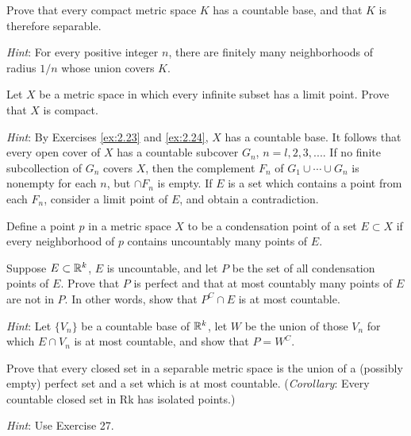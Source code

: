 \begin{myExercise}
    \label{ex:2.25}
    Prove that every compact metric space $K$ has a countable base, 
    and that $K$ is therefore separable. 
    
    \emph{Hint}: For every positive integer $n$, 
    there are finitely many neighborhoods of radius $1/n$ whose union covers $K$.
\end{myExercise}


\begin{myExercise}
    \label{ex:2.26}
    Let $X$ be a metric space in which every infinite subset has a limit point. 
    Prove that $X$ is compact. 
    
    \emph{Hint}: By Exercises \ref{ex:2.23} and \ref{ex:2.24}, 
    $X$ has a countable base. 
    It follows that every open cover of $X$ has a countable subcover ${G_n}$, $n = l, 2, 3, ...$.
    If no finite subcollection of ${G_n}$ covers $X$, 
    then the complement $F_n$ of $G_1 \cup \cdots \cup G_n$
    is nonempty for each $n$, but $\cap F_n$ is empty. 
    If $E$ is a set which contains a point from each $F_n$, 
    consider a limit point of $E$, and obtain a contradiction.
\end{myExercise}


\begin{myExercise}
    \label{ex:2.27}
    Define a point $p$ in a metric space $X$ to be a condensation point of a set $E \subset X$ if every neighborhood of $p$ contains uncountably many points of $E$. 
    
    Suppose $E \subset {\protect\mathbb R}^k$, $E$ is uncountable, 
    and let $P$ be the set of all condensation points of $E$.
    Prove that $P$ is perfect and that 
    at most countably many points of $E$ are not in $P$. 
    In other words, show that $P^C \cap E$ is at most countable. 
    
    \emph{Hint}: Let $\{V_n\}$ be a countable base of ${\protect\mathbb R}^k$, 
    let $W$ be the union of those $V_n$ for which $E \cap V_n$
    is at most countable, and show that $P = W^C$.
\end{myExercise}

\begin{myExercise}
    \label{ex:2.28}
    Prove that every closed set in a separable metric space is the union of a (possibly empty) perfect set and a set which is at most countable. 
    (\emph{Corollary}: Every countable closed set in Rk has isolated points.) 
    
    \emph{Hint}: Use Exercise 27.
\end{myExercise}


